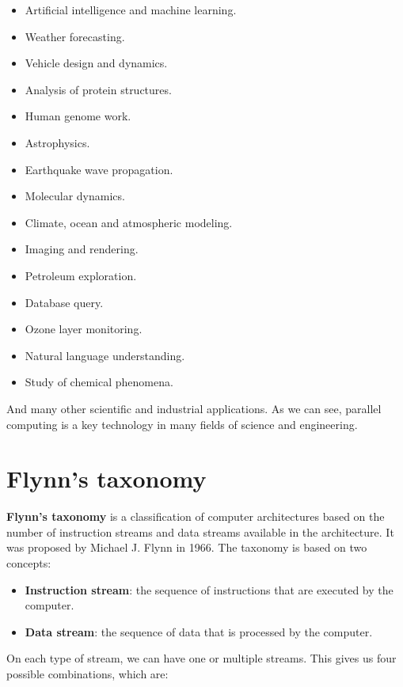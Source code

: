 \begin{itemize}
    \item Artificial intelligence and machine learning.
    \item Weather forecasting.
    \item Vehicle design and dynamics.
    \item Analysis of protein structures.
    \item Human genome work.
    \item Astrophysics.
    \item Earthquake wave propagation.
    \item Molecular dynamics.
    \item Climate, ocean and atmospheric modeling.
    \item Imaging and rendering.
    \item Petroleum exploration.
    \item Database query.
    \item Ozone layer monitoring.
    \item Natural language understanding.
    \item Study of chemical phenomena.
\end{itemize}

And many other scientific and industrial applications. As we can see, parallel computing
is a key technology in many fields of science and engineering.

\section{Flynn's taxonomy}

\textbf{Flynn's taxonomy} is a classification of computer architectures based on the number
of instruction streams and data streams available in the architecture. It was proposed by
Michael J. Flynn in 1966. The taxonomy is based on two concepts:

\begin{itemize}
    \item \textbf{Instruction stream}: the sequence of instructions that are executed by the
    computer.
    
    \item \textbf{Data stream}: the sequence of data that is processed by the computer.
\end{itemize}

On each type of stream, we can have one or multiple streams. This gives us four possible
combinations, which are:

